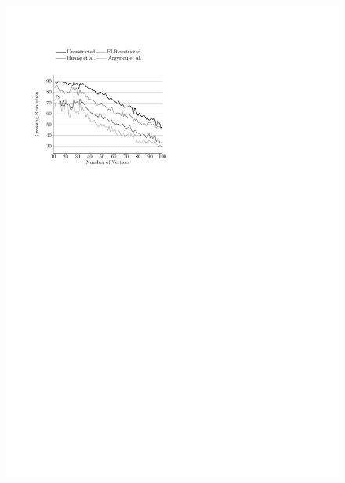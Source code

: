 \documentclass{comjnl}
\begin{document}
\begin{figure}[t]
{	\includegraphics[scale=0.99,page=10]{figures/rome}}
	

\end{figure}
\end{document}
